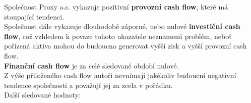 
Společnost Proxy a.s. vykazuje pozitivní \textbf{provozní cash flow}, které má stoupající tendenci.\\

Společnost dále vykazuje dlouhodobě záporné, nebo nulové \textbf{investiční cash flow}, což vzhledem k povaze tohoto ukazatele neznamená problém, neboť pořízená aktiva mohou do budoucna generovat vyšší zisk a vyšší provozní cash flow.\\

\textbf{Finanční cash flow} je za celé sledované období nulové.\\

Z výše přiloženého cash flow autoři nevnímají jakékoliv budoucní negativní tendence společnosti a považují jej za zcela v pořádku.\\

Další sledované hodnoty:\\

